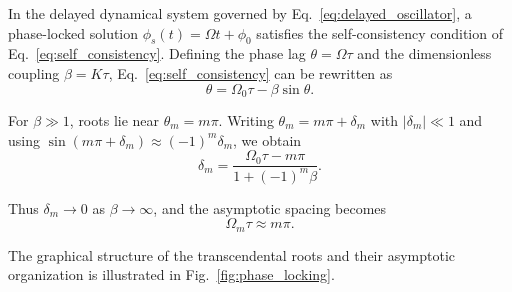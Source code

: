 \documentclass[11pt,a4paper]{article}
\begin{document}
        In the delayed dynamical system governed by Eq.~\ref{eq:delayed_oscillator}, a phase-locked solution $\phi_s(t)=\Omega t+\phi_0$ satisfies the self-consistency condition of Eq.~\ref{eq:self_consistency}. Defining the phase lag $\theta=\Omega\tau$ and the dimensionless coupling $\beta=K\tau$, Eq.~\ref{eq:self_consistency} can be rewritten as
        \begin{equation}
            \theta=\Omega_0\tau-\beta\sin\theta.
            \label{eq:theta_beta}
        \end{equation}

        For $\beta\gg1$, roots lie near $\theta_m=m\pi$. Writing $\theta_m=m\pi+\delta_m$ with $|\delta_m|\ll1$ and using $\sin(m\pi+\delta_m)\approx(-1)^m\delta_m$, we obtain
        \begin{equation}
            \delta_m=\frac{\Omega_0\tau-m\pi}{1+(-1)^m\beta}.
            \label{eq:delta_m}
        \end{equation}

        Thus $\delta_m\to0$ as $\beta\to\infty$, and the asymptotic spacing becomes
        \begin{equation}
            \Omega_m\tau\approx m\pi.
            \label{eq:omega_m_approx}
        \end{equation}

        The graphical structure of the transcendental roots and their asymptotic organization is illustrated in Fig.~\ref{fig:phase_locking}.
\end{document}
